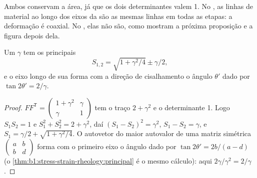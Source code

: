 Ambos conservam a área, já que os dois determinantes valem 1. No , as linhas de material ao longo dos eixos da  são as mesmas linhas em todas as etapas: a deformação é coaxial. No , elas não são, como mostram a próxima proposição e a figura depois dela.

\begin{proposition}\label{prop:b1:stress-strain-rheology:simple-shear}
Um  $\gamma$ tem os  principais
\[
  S_{1,2} = \sqrt{1 + \gamma^2/4} \pm \gamma/2 ,
\]
e o eixo longo de sua  forma com a direção de cisalhamento o ângulo $\theta'$ dado por $\tan2\theta' = 2/\gamma$.
\end{proposition}

\begin{proof}
$FF^{\mathsf T} = \begin{pmatrix} 1+\gamma^2 & \gamma \\ \gamma & 1\end{pmatrix}$
tem o traço $2+\gamma^2$ e o determinante 1. Logo $S_1S_2 = 1$ e $S_1^2 + S_2^2 = 2 + \gamma^2$, daí $(S_1 - S_2)^2 = \gamma^2$,
$S_1 - S_2 = \gamma$, e $S_1 = \gamma/2 + \sqrt{1+\gamma^2/4}$. O autovetor do maior autovalor de uma matriz simétrica
$\begin{pmatrix} a & b \\ b & d\end{pmatrix}$ forma com o primeiro eixo o ângulo dado por $\tan2\theta' = 2b/(a-d)$ (o \cref{thm:b1:stress-strain-rheology:principal}
é o mesmo cálculo): aqui $2\gamma/\gamma^2 = 2/\gamma$.
\end{proof}

